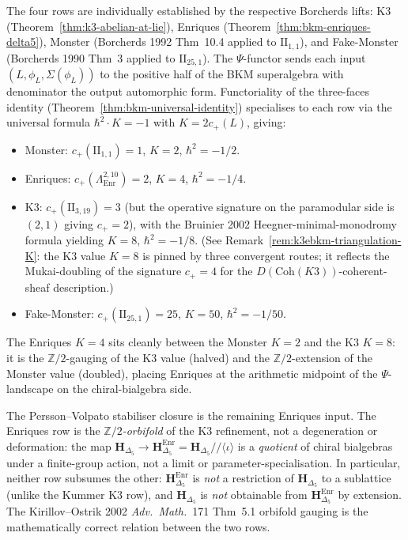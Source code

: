 \begin{remark}
The four rows are individually established by the respective
Borcherds lifts: K3 (Theorem~\ref{thm:k3-abelian-at-lie}),
Enriques (Theorem~\ref{thm:bkm-enriques-delta5}), Monster
(Borcherds 1992 Thm~10.4 applied to $\mathrm{II}_{1,1}$), and
Fake-Monster (Borcherds 1990 Thm~3 applied to $\mathrm{II}_{25,1}$).
The $\Psi$-functor sends each input $(L,\phi_L,\Sigma(\phi_L))$
to the positive half of the BKM superalgebra with denominator the
output automorphic form. Functoriality of the three-faces
identity (Theorem~\ref{thm:bkm-universal-identity})
specialises to each row via the universal formula
$\hbar^2\cdot K = -1$ with $K = 2c_+(L)$, giving:
\begin{itemize}
\item Monster: $c_+(\mathrm{II}_{1,1}) = 1$, $K = 2$, $\hbar^2 = -1/2$.
\item Enriques: $c_+(\Lambda^{2,10}_{\mathrm{Enr}}) = 2$, $K = 4$,
 $\hbar^2 = -1/4$.
\item K3: $c_+(\mathrm{II}_{3,19}) = 3$ (but the operative signature
 on the paramodular side is $(2,1)$ giving $c_+ = 2$), with
 the Bruinier 2002 Heegner-minimal-monodromy formula
 yielding $K = 8$, $\hbar^2 = -1/8$.
 (See Remark~\ref{rem:k3ebkm-triangulation-K}: the K3 value
 $K = 8$ is pinned by three convergent routes; it reflects
 the Mukai-doubling of the signature $c_+ = 4$ for the
 $D(\mathrm{Coh}(K3))$-coherent-sheaf description.)
\item Fake-Monster: $c_+(\mathrm{II}_{25,1}) = 25$, $K = 50$,
 $\hbar^2 = -1/50$.
\end{itemize}
The Enriques $K = 4$ sits cleanly between the Monster $K = 2$ and
the K3 $K = 8$: it is the $\mathbb{Z}/2$-gauging of the K3 value
(halved) and the $\mathbb{Z}/2$-extension of the Monster value
(doubled), placing Enriques at the arithmetic midpoint of the
$\Psi$-landscape on the chiral-bialgebra side.
\end{remark}

\begin{remark}
\label{rem:bkm-enriques-specific-vs-general}
The Persson--Volpato stabiliser closure is the remaining Enriques
input.
The Enriques row is the \emph{$\mathbb{Z}/2$-orbifold} of the K3
refinement, not a degeneration or deformation: the map
$\mathbf{H}_{\Delta_5}\to\mathbf{H}_{\Delta_5}^{\mathrm{Enr}}
=\mathbf{H}_{\Delta_5}/\!/\langle\iota\rangle$ is a \emph{quotient}
of chiral bialgebras under a finite-group action, not a limit
or parameter-specialisation. In particular, neither row subsumes
the other: $\mathbf{H}_{\Delta_5}^{\mathrm{Enr}}$ is \emph{not} a
restriction of $\mathbf{H}_{\Delta_5}$ to a sublattice (unlike the
Kummer K3 row), and $\mathbf{H}_{\Delta_5}$ is \emph{not} obtainable
from $\mathbf{H}_{\Delta_5}^{\mathrm{Enr}}$ by extension. The
Kirillov--Ostrik 2002 \emph{Adv.~Math.}~171 Thm~5.1 orbifold
gauging is the mathematically correct relation between the two
rows.
\end{remark}

